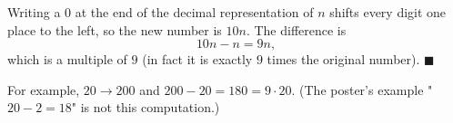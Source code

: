 Writing a $0$ at the end of the decimal representation of $n$ shifts every digit one place to the left, so the new number is $10n$. The difference is
\[10n-n=9n,\]
which is a multiple of $9$ (in fact it is exactly $9$ times the original number). $\blacksquare$

For example, $20\to200$ and $200-20=180=9\cdot20$. (The poster's example "$20-2=18$" is not this computation.)
